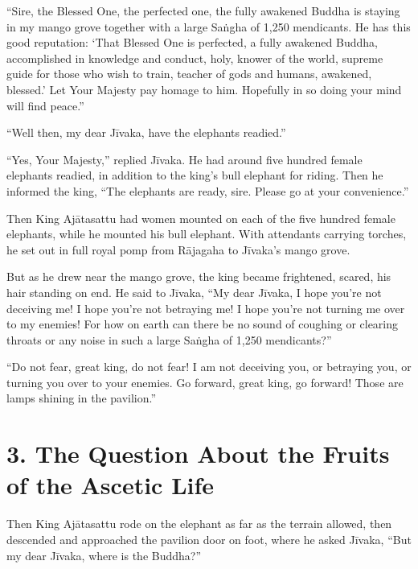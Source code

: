 \documentclass[12pt,openany]{book}%
\begin{document}
“Sire, the Blessed One, the perfected one, the fully awakened Buddha is staying in my mango grove together with a large \textsanskrit{Saṅgha} of 1,250 mendicants. He has this good reputation: ‘That Blessed One is perfected, a fully awakened Buddha, accomplished in knowledge and conduct, holy, knower of the world, supreme guide for those who wish to train, teacher of gods and humans, awakened, blessed.’ Let Your Majesty pay homage to him. Hopefully in so doing your mind will find peace.” 

“Well then, my dear \textsanskrit{Jīvaka}, have the elephants readied.” 

“Yes, Your Majesty,” replied \textsanskrit{Jīvaka}. He had around five hundred female elephants readied, in addition to the king’s bull elephant for riding. Then he informed the king, “The elephants are ready, sire. Please go at your convenience.” 

Then King \textsanskrit{Ajātasattu} had women mounted on each of the five hundred female elephants, while he mounted his bull elephant. With attendants carrying torches, he set out in full royal pomp from \textsanskrit{Rājagaha} to \textsanskrit{Jīvaka}’s mango grove. 

But as he drew near the mango grove, the king became frightened, scared, his hair standing on end. He said to \textsanskrit{Jīvaka}, “My dear \textsanskrit{Jīvaka}, I hope you’re not deceiving me! I hope you’re not betraying me! I hope you’re not turning me over to my enemies! For how on earth can there be no sound of coughing or clearing throats or any noise in such a large \textsanskrit{Saṅgha} of 1,250 mendicants?” 

“Do not fear, great king, do not fear! I am not deceiving you, or betraying you, or turning you over to your enemies. Go forward, great king, go forward! Those are lamps shining in the pavilion.” 

\section*{3. The Question About the Fruits of the Ascetic Life }

Then King \textsanskrit{Ajātasattu} rode on the elephant as far as the terrain allowed, then descended and approached the pavilion door on foot, where he asked \textsanskrit{Jīvaka}, “But my dear \textsanskrit{Jīvaka}, where is the Buddha?” 
\end{document}
